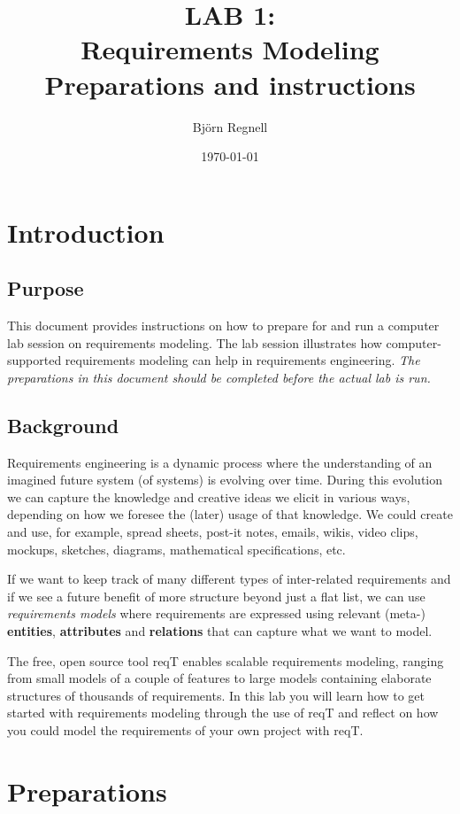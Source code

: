 \documentclass[11pt]{article}
\title{{\bf LAB 1:\\Requirements Modeling}\\ Preparations and instructions}
\author{Björn Regnell}
\date{\today}
\begin{document}
\maketitle

\section{Introduction}

\subsection{Purpose} This document provides instructions on how to prepare for and run a computer lab session on requirements modeling. The lab session illustrates how computer-supported requirements modeling can help in requirements engineering. {\it The preparations in this document should be completed before the actual lab is run.}

\subsection{Background} Requirements engineering is a dynamic process where the understanding of an imagined future system (of systems) is evolving over time. During this evolution we can capture the knowledge and creative ideas we elicit in various ways, depending on how we foresee the (later) usage of that knowledge. We could create and use, for example, spread sheets, post-it notes, emails, wikis, video clips, mockups, sketches, diagrams, mathematical specifications, etc. 

If we want to keep track of many different types of inter-related requirements and if we see a future benefit of more structure beyond just a flat list, we can use {\it requirements models} where requirements are expressed using relevant (meta-) {\bf entities}, {\bf attributes} and {\bf relations} that can capture what we want to model.   

The free, open source tool reqT enables scalable requirements modeling, ranging from small models of a couple of features to large models containing elaborate structures of thousands of requirements. In this lab you will learn how to get started with requirements modeling through the use of reqT and reflect on how you could model the requirements of your own project with reqT.

\clearpage\newpage
\section{Preparations}
\end{document}
